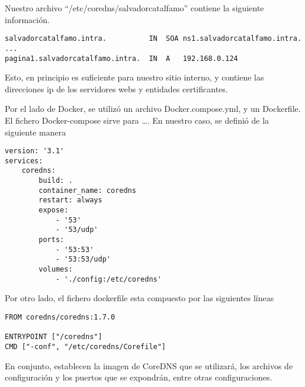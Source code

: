 Nuestro archivo “/etc/coredns/salvadorcatalfamo” contiene la siguiente información.
\begin{verbatim}
salvadorcatalfamo.intra.          IN  SOA ns1.salvadorcatalfamo.intra. ...
pagina1.salvadorcatalfamo.intra.  IN  A   192.168.0.124   
\end{verbatim}

Esto, en principio es suficiente para nuestro sitio interno, y contiene las direcciones ip de los 
servidores webs y entidades certificantes.

Por el lado de Docker, se utilizó un archivo Docker.compose.yml, y un Dockerfile. El fichero 
Docker-compose sirve para …. En nuestro caso, se definió de la siguiente manera

\begin{verbatim}
version: '3.1'
services:
    coredns:
        build: .
        container_name: coredns
        restart: always
        expose:
            - '53'
            - '53/udp'
        ports:
            - '53:53'
            - '53:53/udp'
        volumes:
            - './config:/etc/coredns'    
\end{verbatim}

Por otro lado, el fichero dockerfile esta compuesto por las siguientes líneas
\begin{verbatim}
FROM coredns/coredns:1.7.0

ENTRYPOINT ["/coredns"]
CMD ["-conf", "/etc/coredns/Corefile"]    
\end{verbatim}

En conjunto, establecen la imagen de CoreDNS que se utilizará, los archivos de configuración y
los puertos que se expondrán, entre otras configuraciones.
